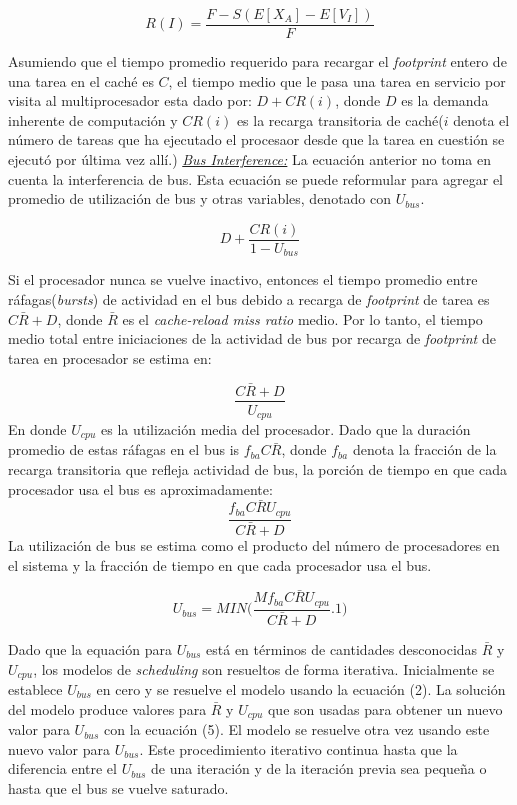 \begin{equation}
    R(I) = \frac{F - S(E[X_A] - E[V_I])}{F}
\end{equation}

Asumiendo que el tiempo promedio requerido para recargar el \textit{footprint} entero de una tarea en el caché es $C$, el tiempo medio que le pasa una tarea en servicio por visita al multiprocesador esta dado por: $D + CR(i)$, donde $D$ es la demanda inherente de computación y $CR(i)$ es la recarga transitoria de caché($i$ denota el número de tareas que ha ejecutado el procesaor desde que la tarea en cuestión se ejecutó por última vez allí.) \underline{\textit{Bus Interference:}} La ecuación anterior no toma en cuenta la interferencia de bus. Esta ecuación se puede reformular para agregar el promedio de utilización de bus y otras variables, denotado con $U_{bus}$. 

\begin{equation}
    D + \frac{CR(i)}{1 - U_{bus}}
\end{equation}

Si el procesador nunca se vuelve inactivo, entonces el tiempo promedio entre ráfagas(\textit{bursts}) de actividad en el bus debido a recarga de \textit{footprint} de tarea es $C\bar{R} + D$, donde $\bar{R}$ es el \textit{cache-reload miss ratio} medio. Por lo tanto, el tiempo medio total entre iniciaciones de la actividad de bus por recarga de \textit{footprint} de tarea en procesador se estima en:

\begin{equation}
       \frac{C\bar{R}+D}{U_{cpu}}
\end{equation}
En donde $U_{cpu}$ es la utilización media del procesador. Dado que la duración promedio de estas ráfagas en el bus is $f_{ba}C\bar{R}$, donde $f_{ba}$ denota la fracción de la recarga transitoria que refleja actividad de bus, la porción de tiempo en que cada procesador usa el bus es aproximadamente:
\begin{equation}
    \frac{f_{ba}C\bar{R}U_{cpu}}{C\bar{R} + D}
\end{equation}
La utilización de bus se estima como el producto del número de procesadores en el sistema y la fracción de tiempo en que cada procesador usa el bus.

\begin{equation}
    U_{bus} = MIN \bigg( \frac{Mf_{ba}C\bar{R}U_{cpu}}{C\bar{R} + D}\text{.} 1 \bigg)
\end{equation}

Dado que la equación para $U_{bus}$ está en términos de cantidades desconocidas $\bar{R}$ y $U_{cpu}$, los modelos de \textit{scheduling} son resueltos de forma iterativa. Inicialmente se establece $U_{bus}$ en cero y se resuelve el modelo usando la ecuación (2). La solución del modelo produce valores para $\bar{R}$ y $U_{cpu}$ que son usadas para obtener un nuevo valor para $U_{bus}$ con la ecuación (5). El modelo se resuelve otra vez usando este nuevo valor para $U_{bus}$. Este procedimiento iterativo continua hasta que la diferencia entre el $U_{bus}$ de una iteración y de la iteración previa sea pequeña o hasta que el bus se vuelve saturado.

